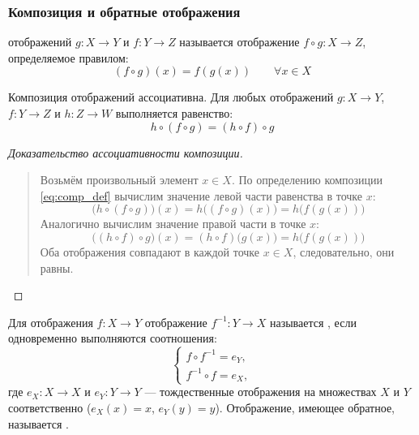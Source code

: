 \subsubsection{Композиция и обратные отображения}

\begin{definition}
     отображений $g: X \to Y$ и 
    $f: Y \to Z$ называется отображение $f \circ g: X \to Z$, определяемое 
    правилом:
    \begin{equation} \label{eq:comp_def}
        (f \circ g)(x) = f(g(x)) \qquad \forall x \in X \tag{8}
    \end{equation}
\end{definition}

\begin{theorem}
    Композиция отображений ассоциативна. Для любых отображений 
    $g: X \to Y$, $f: Y \to Z$ и $h: Z \to W$ выполняется равенство:
    \begin{equation} \label{eq:comp_assoc}
        h \circ (f \circ g) = (h \circ f) \circ g \tag{9}
    \end{equation}
\end{theorem}

\begin{proof}[Доказательство ассоциативности композиции]~\\
    \begin{quote}
        Возьмём произвольный элемент $x \in X$. По определению композиции 
        \eqref{eq:comp_def} вычислим значение левой части равенства в точке $x$:
        \[
            \bigl(h \circ (f \circ g)\bigr)(x) = 
            h\bigl((f \circ g)(x)\bigr) = h\bigl(f(g(x))\bigr)
        \]
        Аналогично вычислим значение правой части в точке $x$:
        \[
            \bigl((h \circ f) \circ g\bigr)(x) = 
            (h \circ f)\bigl(g(x)\bigr) = h\bigl(f(g(x))\bigr)
        \]
        Оба отображения совпадают в каждой точке $x \in X$, следовательно, 
        они равны.
    \end{quote}
\end{proof}

\begin{definition}
    Для отображения $f: X \to Y$ отображение $f^{-1}: Y \to X$ называется 
    , если одновременно выполняются соотношения:
    \begin{equation} \label{eq:inv_map_def}
        \begin{cases}
            f \circ f^{-1} = e_Y, \\
            f^{-1} \circ f = e_X,
        \end{cases} \tag{10}
    \end{equation}
    где $e_X: X \to X$ и $e_Y: Y \to Y$ --- тождественные отображения на 
    множествах $X$ и $Y$ соответственно ($e_X(x) = x$, $e_Y(y) = y$). 
    Отображение, имеющее обратное, называется .
\end{definition}

